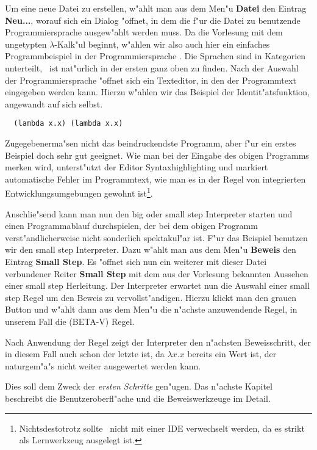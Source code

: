 Um eine neue Datei zu erstellen, w"ahlt man aus dem Men"u {\bf Datei} den Eintrag {\bf Neu...},
worauf sich ein Dialog "offnet, in dem die f"ur die Datei zu benutzende Programmiersprache
ausgew"ahlt werden muss. Da die Vorlesung mit dem ungetypten $\lambda$-Kalk"ul beginnt,
w"ahlen wir also auch hier ein einfaches Programmbeispiel in der Programmiersprache \LZERO.
Die Sprachen sind in Kategorien unterteilt, \LZERO\  ist nat"urlich in der ersten ganz oben zu finden.
Nach der Auswahl der Programmiersprache "offnet sich ein Texteditor, in den der Programmtext
eingegeben werden kann. Hierzu w"ahlen wir das Beispiel der Identit"atsfunktion, angewandt
auf sich selbst.
\begin{verbatim}
  (lambda x.x) (lambda x.x)
\end{verbatim}
Zugegebenerma"sen nicht das beindruckendste Programm, aber f"ur ein erstes Beispiel doch
sehr gut geeignet. Wie man bei der Eingabe des obigen Programms merken wird, unterst"utzt
der Editor Syntaxhighlighting und markiert automatische Fehler im Programmtext, wie man
es in der Regel von integrierten Entwicklungsumgebungen gewohnt ist\footnote{Nichtsdestotrotz
sollte \TPML\ nicht mit einer IDE verwechselt werden, da es strikt als Lernwerkzeug ausgelegt ist.}.

Anschlie"send kann man nun den big oder small step Interpreter starten und einen Programmablauf
durchspielen, der bei dem obigen Programm verst"andlicherweise nicht sonderlich spektakul"ar
ist. F"ur das Beispiel benutzen wir den small step Interpreter. Dazu w"ahlt man aus dem
Men"u {\bf Beweis} den Eintrag {\bf Small Step}. Es "offnet sich nun ein weiterer mit dieser
Datei verbundener Reiter {\bf Small Step} mit dem aus der Vorlesung bekannten Aussehen einer
small step Herleitung. Der Interpreter erwartet nun die Auswahl einer small step Regel um den
Beweis zu vervollst"andigen. Hierzu klickt man den grauen Button und w"ahlt dann aus
dem Men"u die n"achste anzuwendende Regel, in unserem Fall die (BETA-V) Regel.

Nach Anwendung der Regel zeigt der Interpreter den n"achsten Beweisschritt, der in diesem
Fall auch schon der letzte ist, da $\lambda x.x$ bereits ein Wert ist, der naturgem"a"s
nicht weiter ausgewertet werden kann.

Dies soll dem Zweck der \emph{ersten Schritte} gen"ugen. Das n"achste Kapitel beschreibt
die Benutzeroberfl"ache und die Beweiswerkzeuge im Detail.



